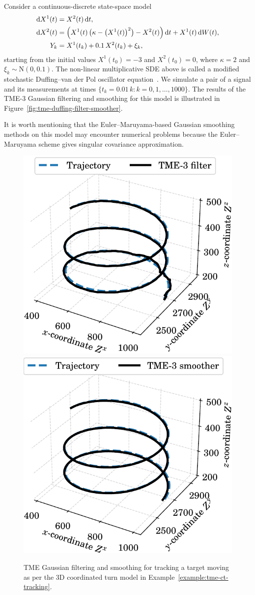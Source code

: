 \begin{example}
	\label{example:tme-duffing-filter-smoother}
	Consider a continuous-discrete state-space model
	\begin{equation}
	\begin{split}
	\mathop{}\!\mathrm{d} X^1(t) &= X^2(t) \mathop{}\!\mathrm{d} t, \\
	\mathop{}\!\mathrm{d} X^2(t) &= \Big(X^1(t) \, \big(\kappa - \big(X^1(t)\big)^2\big) - X^2(t) \Big) \mathop{}\!\mathrm{d} t + X^1(t) \mathop{}\!\mathrm{d} W(t), \\
	Y_k &= X^1(t_k) + 0.1 \, X^2(t_k) + \xi_k,
	\end{split}
	\end{equation}
	starting from the initial values $X^1(t_0) = -3$ and $X^2(t_0)=0$, where $\kappa = 2$ and $\xi_k \sim \mathrm{N}(0, 0.1)$. The non-linear multiplicative SDE above is called a modified stochastic Duffing--van der Pol oscillator equation~\citep{Lord_powell_shardlow_2014, Sarkka2019}. We simulate a pair of a signal and its measurements at times $\lbrace t_k=0.01\,k \colon k=0,1,\ldots,1000 \rbrace$. The results of the TME-3 Gaussian filtering and smoothing for this model is illustrated in Figure~\ref{fig:tme-duffing-filter-smoother}. 
	
	It is worth mentioning that the Euler--Maruyama-based Gaussian smoothing methods on this model may encounter numerical problems because the Euler--Maruyama scheme gives singular covariance approximation.
\end{example}

\begin{figure}[t!]
	\centering
	\includegraphics[width=.494\linewidth]{figs/tme-ct3d-filter}
	\includegraphics[width=.494\linewidth]{figs/tme-ct3d-smoother}
	\caption{TME Gaussian filtering and smoothing for tracking a target moving as per the 3D coordinated turn model in Example~\ref{example:tme-ct-tracking}. }
	\label{fig:tme-ct3d}
\end{figure}

